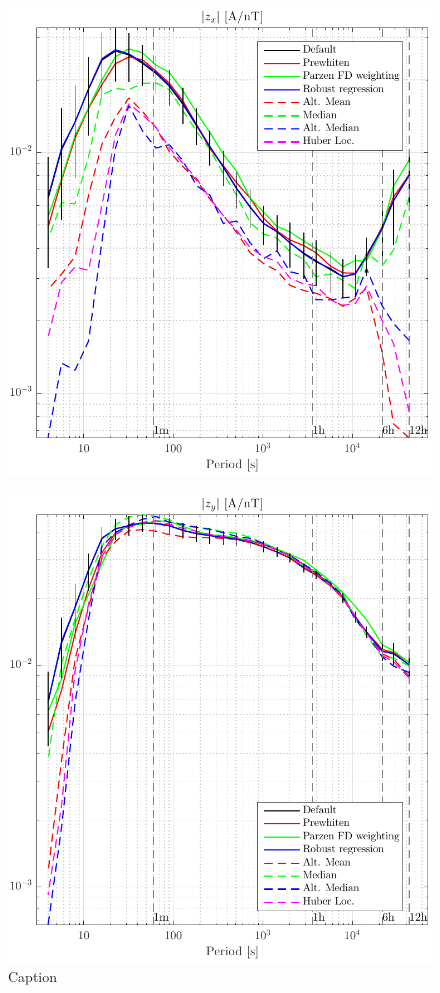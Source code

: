 \documentclass[draft,linenumbers]{agujournal2018}
\begin{document}
\begin{figure}[h]
\begin{minipage}[t]{.48\linewidth}
\end{minipage}
\begin{minipage}[t]{.48\linewidth}
\includegraphics[width=\textwidth]{figures/plot_options_comparison_zx.pdf}
\label{plot_options_comparison_a}
\end{minipage}
\begin{minipage}[t]{.48\linewidth}
\includegraphics[width=\textwidth]{figures/plot_options_comparison_zy.pdf}
\end{minipage}
\caption{Caption}
\label{model_2_and_4_variations}
\end{figure}
\end{document}
